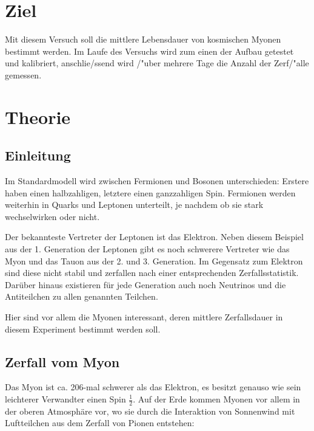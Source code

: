 

\section{Ziel}
Mit diesem Versuch soll die mittlere Lebensdauer von kosmischen Myonen bestimmt werden. Im Laufe des Versuchs wird zum einen der Aufbau getestet und kalibriert, anschlie/ssend wird /"uber mehrere Tage die Anzahl der Zerf/"alle gemessen.

\section{Theorie}
\subsection{Einleitung}
Im Standardmodell wird zwischen Fermionen und Bosonen unterschieden: Erstere haben einen halbzahligen, letztere einen ganzzahligen Spin. Fermionen werden weiterhin in Quarks und Leptonen unterteilt, je nachdem ob sie stark wechselwirken oder nicht. 

Der bekannteste Vertreter der Leptonen ist das Elektron. Neben diesem Beispiel aus der 1. Generation der Leptonen gibt es noch schwerere Vertreter wie das Myon und das Tauon aus der 2. und 3. Generation. Im Gegensatz zum Elektron sind diese nicht stabil und zerfallen nach einer entsprechenden Zerfallsstatistik. Dar\"uber hinaus existieren f\"ur jede Generation auch noch Neutrinos und die Antiteilchen zu allen genannten Teilchen.

Hier sind vor allem die Myonen interessant, deren mittlere Zerfallsdauer in diesem Experiment bestimmt werden soll.

\subsection{Zerfall vom Myon}
Das Myon ist ca. 206-mal schwerer als das Elektron, es besitzt genauso wie sein leichterer Verwandter einen Spin $\frac{1}{2}$. Auf der Erde kommen Myonen vor allem in der oberen Atmosph\"are vor, wo sie durch die Interaktion von Sonnenwind mit Luftteilchen aus dem Zerfall von Pionen entstehen:

